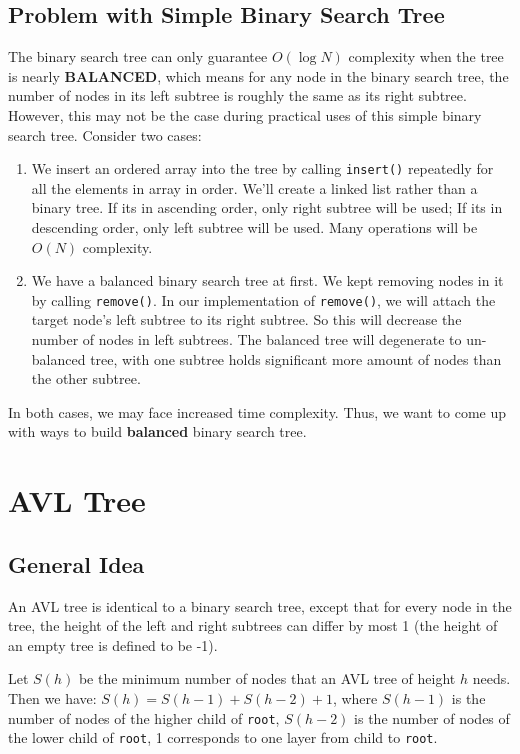 \documentclass[12pt]{book}
\begin{document}
\subsection{Problem with Simple Binary Search Tree}
\label{sec:orgc11adaa}
The binary search tree can only guarantee \(O(\log{N})\) complexity when the tree is nearly \textbf{BALANCED}, which means for any node in the binary search tree, the number of nodes in its left subtree is roughly the same as its right subtree. However, this may not be the case during practical uses of this simple binary search tree. Consider two cases:
\begin{enumerate}
\item We insert an ordered array into the tree by calling \texttt{insert()} repeatedly for all the elements in array in order. We'll create a linked list rather than a binary tree. If its in ascending order, only right subtree will be used; If its in descending order, only left subtree will be used. Many operations will be \(O(N)\) complexity.
\item We have a balanced binary search tree at first. We kept removing nodes in it by calling \texttt{remove()}. In our implementation of \texttt{remove()}, we will attach the target node's left subtree to its right subtree. So this will decrease the number of nodes in left subtrees. The balanced tree will degenerate to un-balanced tree, with one subtree holds significant more amount of nodes than the other subtree.
\end{enumerate}

In both cases, we may face increased time complexity. Thus, we want to come up with ways to build \textbf{balanced} binary search tree.

\section{AVL Tree}
\label{sec:org1d98b6b}
\subsection{General Idea}
\label{sec:orgc9d84f7}
An AVL tree is identical to a binary search tree, except that for every node in the tree, the height of the left and right subtrees can differ by most 1 (the height of an empty tree is defined to be -1).

Let \(S(h)\) be the minimum number of nodes that an AVL tree of height \(h\) needs. Then we have: \(S(h) = S(h - 1) + S(h - 2) + 1\), where \(S(h - 1)\) is the number of nodes of the higher child of \texttt{root}, \(S(h - 2)\) is the number of nodes of the lower child of \texttt{root}, 1 corresponds to one layer from child to \texttt{root}.
\end{document}
